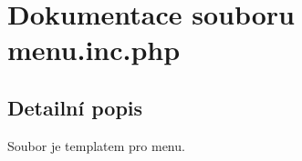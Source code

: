 \section{Dokumentace souboru menu.inc.php}
\label{menu_8inc_8php}


\subsection{Detailní popis}
Soubor je templatem pro menu. 